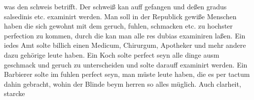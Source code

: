 was den schweis\protect{} betrifft. Der schwei{\ss}\protect{} kan auff gefangen und de{\ss}en gradus salsedinis\protect{} etc. examinirt werden. 
\pend%
\newpage
\pstart%
Man soll in der Republick gewi{\ss}e Menschen haben die sich gewohnt mit dem geruch\protect{}, fuhlen\protect{}, schmacken\protect{} etc. zu hochster perfection zu kommen, durch die kan man alle res dubias examiniren la{\ss}en. 
\pend%
\pstart%
Ein iedes Amt solte billich einen Medicum, Chirurgum\protect{}, Apotheker\protect{} und mehr andere dazu geh\"{o}rige leute haben. 
\pend%
\pstart%
Ein Koch solte perfect seyn alle dinge ausm geschmack\protect{} und geruch\protect{} zu unterscheiden und solte darauff examinirt werden. 
\pend%
\pstart%
Ein Barbierer solte im fuhlen\protect{} perfect seyn, man m\"{u}ste leute haben, die es per tactum dahin gebracht, wohin der Blinde beym herren
so alles m\"{u}glich. 
\pend%
\pstart%
Auch
clarheit, starcke%
